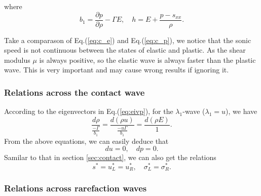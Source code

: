 \documentclass[review]{elsarticle}
\begin{document}
where 
 \begin{equation}
    b_1 = \frac{\partial p}{\partial \rho} - \Gamma E,  \quad h = E +\frac{p-s_{xx}}{\rho}.
  \end{equation}

Take a comparason  of Eq.(\ref{eq:c_e}) and Eq.(\ref{eq:c_p}), we notice that the sonic speed is not continuous between the states of elastic and plastic. As the shear modulus $\mu$ is always positive, so the elastic wave is always faster than the plastic wave.  This is very important and may cause wrong results if ignoring it.   

\subsubsection{Relations across the contact wave}\label{sec:contactp}

According to  the eigenvectors in  Eq.(\ref{eq:eivp}), for the $\lambda_{1}$-wave ($\lambda_1 = u$), we
have
\begin{equation}   \label{e232a}
  \frac{d \rho}{\frac{-\Gamma}{b_1}} = \frac{d (\rho u)}{\frac{-u\Gamma}{b_1}} = \frac{d (\rho E)}{1}.
\end{equation}
From the above equations, we can easily deduce that
\begin{equation}  
  du = 0, \quad dp = 0. 
\end{equation}
Samilar to that in  section \ref{sec:contact}, we can also get the relations
\begin{equation} 
  s^* = u_L^* = u_R^*, %
 \quad
  \sigma^*_L = \sigma^*_R.
\end{equation}

\subsubsection{Relations across rarefaction waves}
\end{document}
